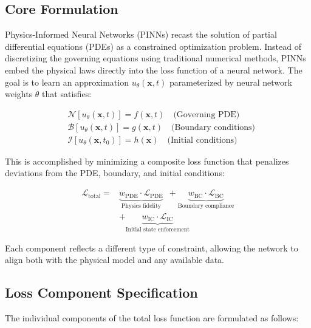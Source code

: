 \documentclass[twocolumn]{svjour3}
\begin{document}
	\subsection{Core Formulation}
	
	Physics-Informed Neural Networks (PINNs) recast the solution of partial differential equations (PDEs) as a constrained optimization problem. Instead of discretizing the governing equations using traditional numerical methods, PINNs embed the physical laws directly into the loss function of a neural network. The goal is to learn an approximation $u_\theta(\mathbf{x}, t)$ parameterized by neural network weights $\theta$ that satisfies:
	
	\begin{align}
		&\mathcal{N}[u_\theta(\mathbf{x}, t)] = f(\mathbf{x}, t) \quad \text{(Governing PDE)} \nonumber \\
		&\mathcal{B}[u_\theta(\mathbf{x}, t)] = g(\mathbf{x}, t) \quad \text{(Boundary conditions)} \nonumber \\
		&\mathcal{I}[u_\theta(\mathbf{x}, t_0)] = h(\mathbf{x}) \quad \text{(Initial conditions)} \nonumber
	\end{align}
	
	This is accomplished by minimizing a composite loss function that penalizes deviations from the PDE, boundary, and initial conditions:
	
	\begin{equation}
	\begin{split}
		\mathcal{L}_{\text{total}} = 
		& \underbrace{w_{\text{PDE}} \cdot \mathcal{L}_{\text{PDE}}}_{\text{Physics fidelity}} \;\:+ 
		\underbrace{w_{\text{BC}} \cdot \mathcal{L}_{\text{BC}}}_{\text{Boundary compliance}} \\
		& + \underbrace{w_{\text{IC}} \cdot \mathcal{L}_{\text{IC}}}_{\text{Initial state enforcement}}
	\end{split}
		\label{eq:total_loss}
	\end{equation}
	
	Each component reflects a different type of constraint, allowing the network to align both with the physical model and any available data.
	
	\subsection{Loss Component Specification}
	
	The individual components of the total loss function are formulated as follows:
	
\end{document}
